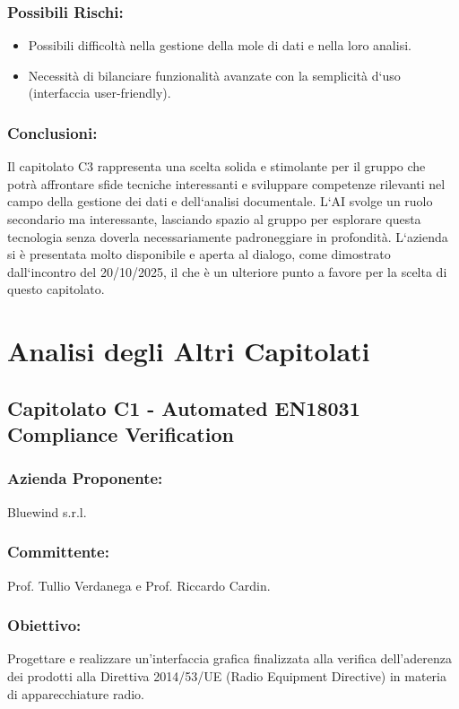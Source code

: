\documentclass[a4paper,12pt]{article}
\begin{document}
\subsubsection*{Possibili Rischi:}
\begin{itemize}
    \item Possibili difficoltà nella gestione della mole di dati e nella loro analisi.
    \item Necessità di bilanciare funzionalità avanzate con la semplicità d`uso
          (interfaccia user-friendly).
\end{itemize}

\subsubsection*{Conclusioni:}
Il capitolato C3 rappresenta una scelta solida e stimolante per il gruppo che potrà affrontare sfide tecniche interessanti e sviluppare competenze rilevanti nel campo della gestione dei dati e dell`analisi documentale.
L`AI svolge un ruolo secondario ma interessante, lasciando spazio al gruppo per esplorare questa tecnologia senza doverla necessariamente padroneggiare in profondità.
L`azienda si è presentata molto disponibile e aperta al dialogo, come dimostrato dall`incontro del 20/10/2025, il che è un ulteriore punto a favore per la scelta di questo capitolato.

\section{Analisi degli Altri Capitolati}

\subsection{Capitolato C1 - Automated EN18031 Compliance Verification}
\subsubsection*{Azienda Proponente:} Bluewind s.r.l.
\subsubsection*{Committente:} Prof. Tullio Verdanega e Prof. Riccardo Cardin.
\subsubsection*{Obiettivo:} Progettare e realizzare un'interfaccia grafica finalizzata alla verifica dell'aderenza dei prodotti alla Direttiva 2014/53/UE (Radio Equipment Directive) in materia di apparecchiature radio.
\end{document}
